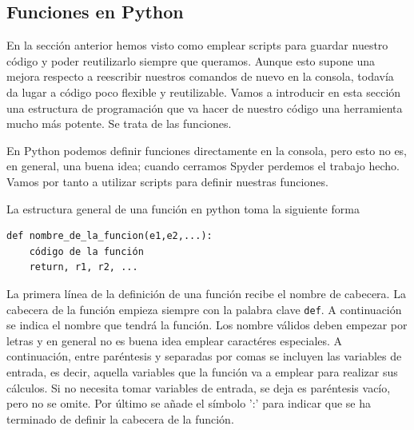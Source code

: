 \begin{paracol}{2}

\section{Funciones en Python} 
En la sección anterior hemos visto como emplear scripts para guardar nuestro código y poder reutilizarlo siempre que queramos. Aunque esto supone una mejora respecto a reescribir nuestros comandos de nuevo en la consola, todavía da lugar a código poco flexible y reutilizable. Vamos a introducir en esta sección una estructura de programación que va hacer de nuestro código una herramienta mucho más potente. Se trata de las funciones.

En Python podemos definir funciones directamente en la consola, pero esto no es, en general, una buena idea; cuando cerramos Spyder perdemos el trabajo hecho. Vamos por tanto a utilizar scripts para definir nuestras funciones.

La estructura general de una función en python toma la siguiente forma

\begin{verbatim}
def nombre_de_la_funcion(e1,e2,...):
    código de la función
    return, r1, r2, ...
\end{verbatim}

La primera línea de la definición de una función recibe el nombre de cabecera. La cabecera de la función empieza siempre con la palabra clave \texttt{def}. A continuación se indica el nombre que tendrá la función. Los nombre válidos deben empezar por letras y en general no es buena idea emplear caractéres especiales. A continuación, entre paréntesis y separadas por comas se incluyen las variables de entrada, es decir, aquella variables que la función va  a emplear para realizar sus cálculos. Si no necesita tomar variables de entrada, se deja es paréntesis vacío, pero no se omite. Por último se añade el símbolo ':' para indicar que se ha terminado de definir la cabecera de la función.


\end{paracol}

